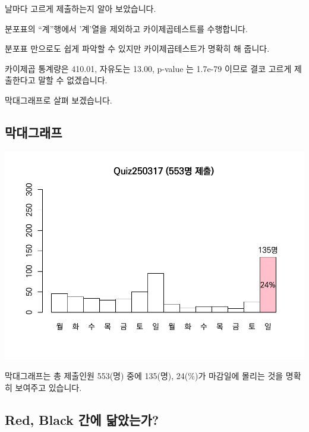 \documentclass[
]{book}
\begin{document}
날마다 고르게 제출하는지 알아 보았습니다.

분포표의 ``계''행에서 '계'열을 제외하고 카이제곱테스트를 수행합니다.

분포표 만으로도 쉽게 파악할 수 있지만 카이제곱테스트가 명확히 해 줍니다.

카이제곱 통계량은 410.01, 자유도는 13.00, p-value 는 1.7e-79 이므로 결코 고르게 제출한다고 말할 수 없겠습니다.

막대그래프로 살펴 보겠습니다.

\subsection{막대그래프}\label{uxb9c9uxb300uxadf8uxb798uxd504-2}

\includegraphics{Quiz_report_2025_files/figure-latex/unnamed-chunk-63-1.pdf}

막대그래프는 총 제출인원 553(명) 중에 135(명), 24(\%)가 마감일에 몰리는 것을 명확히 보여주고 있습니다.

\subsection{Red, Black 간에 닮았는가?}\label{red-black-uxac04uxc5d0-uxb2eeuxc558uxb294uxac00-2}
\end{document}
